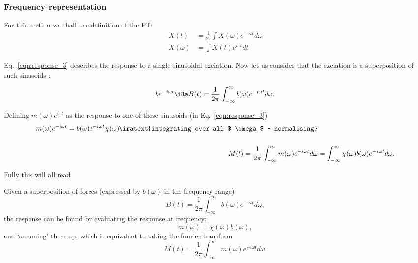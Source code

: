 \newpage\subsubsection{Frequency representation}
\begin{framed}\noindent
  For this section we shall use definition of the FT:
  \[
    \begin{aligned}X(t) & = \frac{1}{2\pi}\int X(\omega)e^{-i\omega t}d\omega\\
      X(\omega) & = \int X(t)e^{i\omega t}dt
    \end{aligned}
  \]

\end{framed}
Eq.~\eqref{eqn:response_3}  describes   the  response  to  a   single  sinusoidal
exciation. Now  let us  consider that  the exciation is  a superposition  of such
sinusoids :

   \begin{equation}
     be^{-i\omega t} \iRa B(t) = \frac{1}{2\pi}\int_{-\infty}^{\infty}b(\omega)e^{-i\omega t}d\omega.
   \end{equation}

   Defining  $ m(\omega)e^{i\omega  t} $  as the  response to  one of  these sinusoids  (in
   Eq.~\eqref{eqn:response_3}) %
   \begin{equation}\label{eqn:freq_1}
     \begin{aligned}
       {m(\omega)e^{-i\omega  t}   =  b(\omega)e^{-i\omega  t}\chi(\omega)}  \iratext{integrating   over  all
         $                                                                      \omega
         $ + normalising} &\\\\ \ M(t) = \frac{1}{2\pi}\int_{-\infty}^{\infty}m(\omega)e^{-i\omega t}d\omega &=
       \int_{-\infty}^{\infty}\chi(\omega)b(\omega)e^{-i\omega t}d\omega.
     \end{aligned}
   \end{equation}

   \noindent Fully this will all read

\begin{framed}\noindent
  Given a superposition of forces (expressed by $ b(\omega) $ in the frequency range)
  \begin{equation}\label{eqn:freq_2}
    B(t) = \frac{1}{2\pi}\int_{-\infty}^{\infty}b(\omega)e^{-i\omega t}d\omega,
  \end{equation}
  \noindent the response can be found by evaluating the response at frequency:
  \begin{equation}\label{eqn:freq_3}
    m(\omega) = \chi(\omega)b(\omega),
  \end{equation}
  \noindent and  `summing' them  up, which  is equivalent  to taking  the fourier
  transform
  \begin{equation}\label{eqn:freq_4}
    M(t) = \frac{1}{2\pi}\int_{-\infty}^{\infty}m(\omega)e^{-i\omega t}d\omega.
  \end{equation}
\end{framed}

